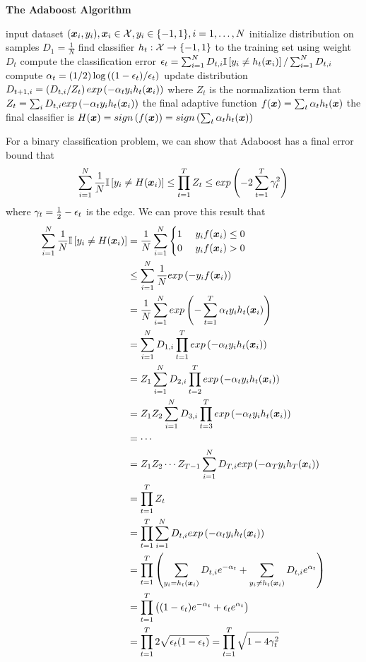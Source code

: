 \begin{algorithm}[H]
	\caption*{\bf The Adaboost Algorithm}
	\begin{algorithmic}
		\State input dataset $(\boldsymbol{x}_i,y_i),\boldsymbol{x}_i\in\mathcal{X},y_i\in\{-1,1\},i=1,\dotsc,N$
		\State initialize distribution on samples $D_1=\frac{1}{N}$
		\State find classifier $h_t:\mathcal{X}\to\{-1,1\}$ to the training set using weight $D_t$
		\State compute the classification error $\epsilon_t=\sum_{i=1}^ND_{t,i}\mathbb{I}\left[y_i\neq h_t(\boldsymbol{x}_i)\right]/\sum_{i=1}^ND_{t,i}$
		\State compute $\alpha_t=\left(1/2\right)\log\left((1-\epsilon_t)/\epsilon_t\right)$
		\State update distribution $D_{t+1,i}=\left(D_{t,i}/Z_t\right)exp\left(-\alpha_ty_ih_t(\boldsymbol{x}_i)\right)$ where $Z_t$ is the normalization term that $Z_t=\sum_iD_{t,i}exp\left(-\alpha_ty_ih_t(\boldsymbol{x}_i)\right)$
		\EndFor
		\State the final adaptive function $f(\boldsymbol{x})=\sum_t\alpha_th_t(\boldsymbol{x})$
		\State the final classifier is $H(\boldsymbol{x})=sign\left(f(\boldsymbol{x})\right)=sign\left(\sum_t\alpha_th_t(\boldsymbol{x})\right)$
	\end{algorithmic}
\end{algorithm}
For a binary classification problem, we can show that Adaboost has a final error bound that
\begin{align*}
\sum_{i=1}^N\frac{1}{N}\mathbb{I}\left[y_i\neq H(\boldsymbol{x}_i)\right]\leq\prod_{t=1}^TZ_t\leq exp\left(-2\sum_{t=1}^T\gamma_t^2\right)
\end{align*}
where $\gamma_t=\frac{1}{2}-\epsilon_t$ is the edge. We can prove this result that
\begin{align*}
\sum_{i=1}^N\frac{1}{N}\bI\left[y_i\neq H(\vec{x}_i)\right]&=\frac{1}{N}\sum_{i=1}^N\casefill{1\ &y_if(\vec{x}_i)\leq 0\\0\ &y_if(\vec{x}_i)>0} \\
&\leq\sum_{i=1}^N\frac{1}{N}\e{-y_if(\vec{x}_i)} \\
&=\frac{1}{N}\sum_{i=1}^N\e{-\sum_{t=1}^T\al_ty_ih_t(\vec{x}_i)} \\
&=\sum_{i=1}^ND_{1,i}\prod_{t=1}^T\e{-\al_ty_ih_t(\vec{x}_i)} \\
&=Z_1\sum_{i=1}^ND_{2,i}\prod_{t=2}^T\e{-\al_ty_ih_t(\vec{x}_i)} \\
&=Z_1Z_2\sum_{i=1}^ND_{3,i}\prod_{t=3}^T\e{-\al_ty_ih_t(\vec{x}_i)} \\
&=\cdots \\
&=Z_1Z_2\cdots Z_{T-1}\sum_{i=1}^ND_{T,i}\e{-\al_Ty_ih_T(\vec{x}_i)} \\
&=\prod_{t=1}^TZ_t \\
&=\prod_{t=1}^T\sum_{i=1}^ND_{t,i}\e{-\al_ty_ih_t(\vec{x}_i)} \\
&=\prod_{t=1}^T\left(\sum_{y_i=h_t(\vec{x}_i)}D_{t,i}e^{-\al_t}+\sum_{y_i\neq h_t(\vec{x}_i)}D_{t,i}e^{\al_t}\right) \\
&=\prod_{t=1}^T\left((1-\ep_t)e^{-\al_t}+\ep_te^{\al_t}\right) \\
&=\prod_{t=1}^T2\sqrt{\ep_t(1-\ep_t)}=\prod_{t=1}^T\sqrt{1-4\ga_t^2}
\end{align*}
